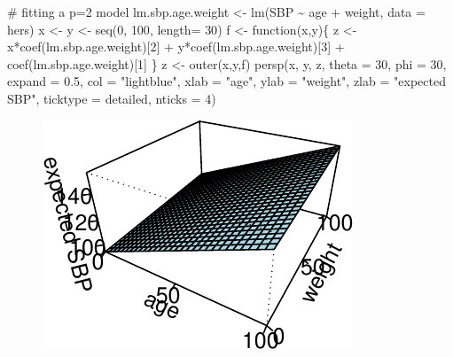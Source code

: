 \documentclass[
  letterpaper,
  DIV=11,
  numbers=noendperiod]{scrreport}
\newenvironment{Shaded}{\begin{snugshade}}{\end{snugshade}}
\newcommand{\AttributeTok}[1]{\textcolor[rgb]{0.40,0.45,0.13}{#1}}
\newcommand{\CommentTok}[1]{\textcolor[rgb]{0.37,0.37,0.37}{#1}}
\newcommand{\ControlFlowTok}[1]{\textcolor[rgb]{0.00,0.23,0.31}{#1}}
\newcommand{\DecValTok}[1]{\textcolor[rgb]{0.68,0.00,0.00}{#1}}
\newcommand{\FloatTok}[1]{\textcolor[rgb]{0.68,0.00,0.00}{#1}}
\newcommand{\FunctionTok}[1]{\textcolor[rgb]{0.28,0.35,0.67}{#1}}
\newcommand{\NormalTok}[1]{\textcolor[rgb]{0.00,0.23,0.31}{#1}}
\newcommand{\OtherTok}[1]{\textcolor[rgb]{0.00,0.23,0.31}{#1}}
\newcommand{\SpecialCharTok}[1]{\textcolor[rgb]{0.37,0.37,0.37}{#1}}
\newcommand{\StringTok}[1]{\textcolor[rgb]{0.13,0.47,0.30}{#1}}
\begin{document}
\begin{Shaded}
\begin{Highlighting}[]
\CommentTok{\# fitting a p=2 model}
\NormalTok{lm.sbp.age.weight }\OtherTok{\textless{}{-}} \FunctionTok{lm}\NormalTok{(SBP }\SpecialCharTok{\textasciitilde{}}\NormalTok{ age }\SpecialCharTok{+}\NormalTok{ weight, }\AttributeTok{data =}\NormalTok{ hers)}
\NormalTok{x }\OtherTok{\textless{}{-}}\NormalTok{ y }\OtherTok{\textless{}{-}} \FunctionTok{seq}\NormalTok{(}\DecValTok{0}\NormalTok{, }\DecValTok{100}\NormalTok{, }\AttributeTok{length=} \DecValTok{30}\NormalTok{)}
\NormalTok{f }\OtherTok{\textless{}{-}} \ControlFlowTok{function}\NormalTok{(x,y)\{ z }\OtherTok{\textless{}{-}}\NormalTok{ x}\SpecialCharTok{*}\FunctionTok{coef}\NormalTok{(lm.sbp.age.weight)[}\DecValTok{2}\NormalTok{] }\SpecialCharTok{+}\NormalTok{ y}\SpecialCharTok{*}\FunctionTok{coef}\NormalTok{(lm.sbp.age.weight)[}\DecValTok{3}\NormalTok{] }\SpecialCharTok{+} \FunctionTok{coef}\NormalTok{(lm.sbp.age.weight)[}\DecValTok{1}\NormalTok{] \}}
\NormalTok{z }\OtherTok{\textless{}{-}} \FunctionTok{outer}\NormalTok{(x,y,f)}
\FunctionTok{persp}\NormalTok{(x, y, z, }\AttributeTok{theta =} \DecValTok{30}\NormalTok{, }\AttributeTok{phi =} \DecValTok{30}\NormalTok{, }\AttributeTok{expand =} \FloatTok{0.5}\NormalTok{, }\AttributeTok{col =} \StringTok{"lightblue"}\NormalTok{, }\AttributeTok{xlab =} \StringTok{"age"}\NormalTok{, }\AttributeTok{ylab =} \StringTok{"weight"}\NormalTok{, }\AttributeTok{zlab =} \StringTok{"expected SBP"}\NormalTok{, }\AttributeTok{ticktype =} \StringTok{\textquotesingle{}detailed\textquotesingle{}}\NormalTok{, }\AttributeTok{nticks =} \DecValTok{4}\NormalTok{)}
\end{Highlighting}
\end{Shaded}

\begin{figure}[H]

{\centering \includegraphics{week1/week1_files/figure-pdf/unnamed-chunk-7-1.pdf}

}

\end{figure}
\end{document}
